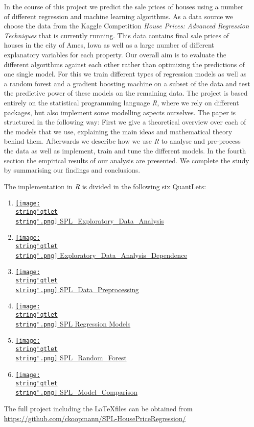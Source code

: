 In the course of this project we predict the sale prices of houses using a number of different regression and machine learning algorithms. As a data source we choose the data from the Kaggle Competition \textit{House Prices: Advanced Regression Techniques} that is currently running. This data contains final sale prices of houses in the city of Ames, Iowa as well as a large number of different explanatory variables for each property. Our overall aim is to evaluate the different algorithms against each other rather than optimizing the predictions of one single model. For this we train different types of regression models as well as a random forest and a gradient boosting machine on a subset of the data and test the predictive power of these models on the remaining data. The project is based entirely on the statistical programming language \textit{R}, where we rely on different packages, but also implement some modelling aspects ourselves. The paper is structured in the following way: First we give a theoretical overview over each of the models that we use, explaining the main ideas and mathematical theory behind them. Afterwards we describe how we use \textit{R} to  analyse and pre-process the data as well as implement, train and tune the different models. In the fourth section the empirical results of our analysis are presented. We complete the study by summarising our findings and conclusions. 


The implementation in \textit{R} is divided in the following six QuantLets:
\begin{enumerate}
\item \href{https://github.com/ckoopmann/SPL-HousePriceRegression/tree/master/quantlets/SPL_Exploratory_Data_Analysis}{\texttt{[image: \\string"qtlet\\string".png]} SPL\_Exploratory\_Data\_Analysis}
\item \href{https://github.com/ckoopmann/SPL-HousePriceRegression/tree/master/quantlets/SPL_Exploratory_Data_Analysis_Dependence}{\texttt{[image: \\string"qtlet\\string".png]} Exploratory\_Data\_Analysis\_Dependence}
\item \href{https://github.com/ckoopmann/SPL-HousePriceRegression/tree/master/quantlets/SPL_Data_Preprocessing}{\texttt{[image: \\string"qtlet\\string".png]} SPL\_Data\_Preprocessing}
\item \href{https://github.com/ckoopmann/SPL-HousePriceRegression/tree/master/quantlets/SPL_Regression_Models}{\texttt{[image: \\string"qtlet\\string".png]} SPL Regression Models}
\item \href{https://github.com/ckoopmann/SPL-HousePriceRegression/tree/master/quantletsSPL_Random_Forest}{\texttt{[image: \\string"qtlet\\string".png]} SPL\_Random\_Forest}
\item \href{https://github.com/ckoopmann/SPL-HousePriceRegression/tree/master/quantlets/SPL_Model_Comparison}{\texttt{[image: \\string"qtlet\\string".png]} SPL\_Model\_Comparison}
\end{enumerate}
The full project including the \LaTeX files can be obtained from \href{https://github.com/ckoopmann/SPL-HousePriceRegression/}{https://github.com/ckoopmann/SPL-HousePriceRegression/}
 